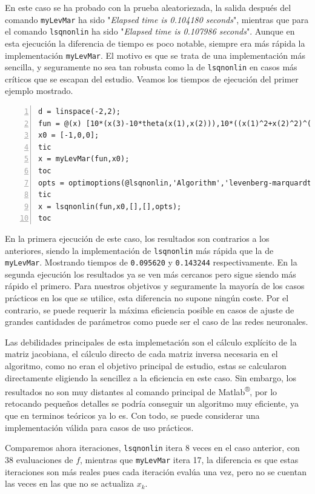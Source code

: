 \documentclass[11pt,a4paper]{book}
\theoremstyle{definition}
\theoremstyle{remark}
\def\code#1{\texttt{#1}}
\begin{document}
En este caso se ha probado con la prueba aleatoriezada, la salida después del comando \code{myLevMar} ha sido "\textit{Elapsed time is 0.104180 seconds}", mientras que para el comando \code{lsqnonlin} ha sido "\textit{Elapsed time is 0.107986 seconds}". Aunque en esta ejecución la diferencia de tiempo es poco notable, siempre era más rápida la implementación \code{myLevMar}. El motivo es que se trata de una implementación más sencilla, y seguramente no sea tan robusta como la de \code{lsqnonlin} en casos más críticos que se escapan del estudio. Veamos los tiempos de ejecución del primer ejemplo mostrado.

\vspace{10pt}
\begin{lstlisting}[frame=single, numbers=left, style=Matlab-editor]
d = linspace(-2,2);
fun = @(x) [10*(x(3)-10*theta(x(1),x(2))),10*((x(1)^2+x(2)^2)^(1/2)-1),x(3)];
x0 = [-1,0,0];
tic
x = myLevMar(fun,x0);
toc
opts = optimoptions(@lsqnonlin,'Algorithm','levenberg-marquardt');
tic
x = lsqnonlin(fun,x0,[],[],opts);
toc
\end{lstlisting}

En la primera ejecución de este caso, los resultados son contrarios a los anteriores, siendo la implementación de \code{lsqnonlin} más rápida que la de \code{myLevMar}. Mostrando tiempos de
\code{0.095620} y \code{0.143244} respectivamente. En la segunda ejecución los resultados ya se ven más cercanos pero sigue siendo más rápido el primero. Para nuestros objetivos y seguramente la mayoría de los casos prácticos en los que se utilice, esta diferencia no supone ningún coste. Por el contrario, se puede requerir la máxima eficiencia posible en casos de ajuste de grandes cantidades de parámetros como puede ser el caso de las redes neuronales.

Las debilidades principales de esta implemetación son el cálculo explícito de la matriz jacobiana, el cálculo directo de cada matriz inversa necesaria en el algoritmo, como no eran el objetivo principal de estudio, estas se calcularon directamente eligiendo la sencillez a la eficiencia en este caso. Sin embargo, los resultados no son muy distantes al comando principal de Matlab\textsuperscript{®}, por lo retocando pequeños detalles se podría conseguir un algoritmo muy eficiente, ya que en terminos teóricos ya lo es. Con todo, se puede considerar una implementación válida para casos de uso prácticos.

Comparemos ahora iteraciones, \code{lsqnonlin} itera 8 veces en el caso anterior, con 38
evaluaciones de $f$, mientras que \code{myLevMar} itera 17, la diferencia es que estas iteraciones son
más reales pues cada iteración evalúa una vez, pero no se cuentan las veces en las que no se actualiza
$x_k$.
\end{document}

